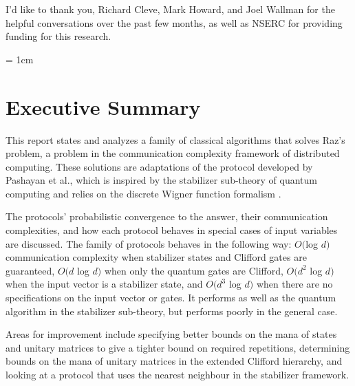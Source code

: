 \documentclass[../3Wworkreport.tex]{subfiles}
\begin{document}
I'd like to thank you, Richard Cleve, Mark Howard, and Joel Wallman for the helpful conversations over the past few months, as well as NSERC for providing funding for this research.

\@author
\makeatother
\newpage

\setcounter{page}{2}
\doublespacing

\tableofcontents
\newpage
{}
{}
\listoffigures
\begingroup
\let\clearpage\relax
\listoftables
\endgroup
{}
\newpage

\doublespacing
\parskip = 1cm
\chapter*{Executive Summary}
\label{chap:summary}

This report states and analyzes a family of classical algorithms that solves Raz\rq{s} problem, a problem in the communication complexity framework of distributed computing. These solutions are adaptations of the protocol developed by Pashayan et al., which is inspired by the stabilizer sub-theory of quantum computing and relies on the discrete Wigner function formalism \cite{Pashayan2014}.
 
 The protocols\rq{} probabilistic convergence to the answer, their communication complexities, and how each protocol behaves in special cases of input variables are discussed. The family of protocols behaves in the following way: $O($log $d)$ communication complexity when stabilizer states and Clifford gates are guaranteed, $O(d$ log $d)$ when only the quantum gates are Clifford, $O(d^2$ log $d)$ when the input vector is a stabilizer state, and $O(d^3$ log $d)$ when there are no specifications on the input vector or gates. It performs as well as the quantum algorithm in the stabilizer sub-theory, but performs poorly in the general case.
 
Areas for improvement include specifying better bounds on the mana of states and unitary matrices to give a tighter bound on required repetitions, determining bounds on the mana of unitary matrices in the extended Clifford hierarchy, and looking at a protocol that uses the nearest neighbour in the stabilizer framework.
\newpage
\end{document}
